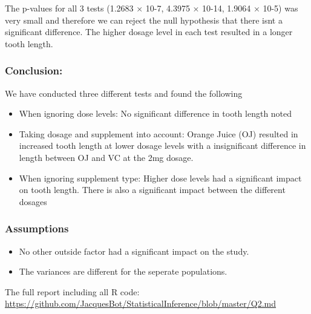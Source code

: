 \documentclass[]{article}
\begin{document}
The p-values for all 3 tests (1.2683 × 10-7, 4.3975 × 10-14, 1.9064 ×
10-5) was very small and therefore we can reject the null hypothesis
that there isnt a significant difference. The higher dosage level in
each test resulted in a longer tooth length.

\subsubsection{Conclusion:}\label{conclusion}

We have conducted three different tests and found the following

\begin{itemize}
\itemsep1pt\parskip0pt
\item
  When ignoring dose levels: No significant difference in tooth length
  noted
\item
  Taking dosage and supplement into account: Orange Juice (OJ) resulted
  in increased tooth length at lower dosage levels with a insignificant
  difference in length between OJ and VC at the 2mg dosage.
\item
  When ignoring supplement type: Higher dose levels had a significant
  impact on tooth length. There is also a significant impact between the
  different dosages
\end{itemize}

\subsubsection{Assumptions}\label{assumptions}

\begin{itemize}
\itemsep1pt\parskip0pt
\item
  No other outside factor had a significant impact on the study.
\item
  The variances are different for the seperate populations.
\end{itemize}

The full report including all R code:
\href{}{\url{https://github.com/JacquesBot/StatisticalInference/blob/master/Q2.md}}
\end{document}
